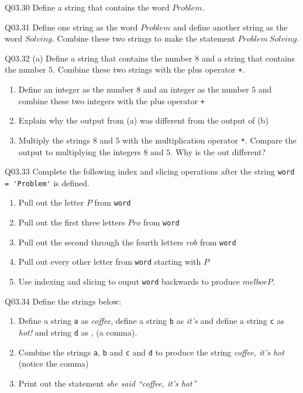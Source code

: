 \documentclass{book}
\newcommand{\passthrough}[1]{#1}
\begin{document}
Q03.30 Define a string that contains the word \(Problem\).

Q03.31 Define one string as the word \(Problem\) and define another
string as the word \(Solving\). Combine these two strings to make the
statement \(Problem \ Solving\).

Q03.32 (a) Define a string that contains the number \(8\) and a string
that contains the number \(5\). Combine these two strings with the plus
operator \passthrough{\lstinline!+!}.

\begin{enumerate}
\def\labelenumi{(\alph{enumi})}
\setcounter{enumi}{1}
\item
  Define an integer as the number \(8\) and an integer as the number
  \(5\) and combine these two integers with the plus operator
  \passthrough{\lstinline!+!}
\item
  Explain why the output from (a) was different from the output of (b)
\item
  Multiply the strings \(8\) and \(5\) with the multiplication operator
  \passthrough{\lstinline!*!}. Compare the output to multiplying the
  integers \(8\) and \(5\). Why is the out different?
\end{enumerate}

Q03.33 Complete the following index and slicing operations after the
string \passthrough{\lstinline!word = 'Problem'!} is defined.

\begin{enumerate}
\def\labelenumi{(\alph{enumi})}
\item
  Pull out the letter \(P\) from \passthrough{\lstinline!word!}
\item
  Pull out the first three letters \(Pro\) from
  \passthrough{\lstinline!word!}
\item
  Pull out the second through the fourth letters \(rob\) from
  \passthrough{\lstinline!word!}
\item
  Pull out every other letter from \passthrough{\lstinline!word!}
  starting with \(P\)
\item
  Use indexing and slicing to ouput \passthrough{\lstinline!word!}
  backwards to produce \(melborP\).
\end{enumerate}

Q03.34 Define the strings below:

\begin{enumerate}
\def\labelenumi{(\alph{enumi})}
\item
  Define a string \passthrough{\lstinline!a!} as \emph{coffee}, define a
  string \passthrough{\lstinline!b!} as \emph{it's} and define a string
  \passthrough{\lstinline!c!} as \emph{hot!} and string
  \passthrough{\lstinline!d!} as , (a comma).
\item
  Combine the strings \passthrough{\lstinline!a!},
  \passthrough{\lstinline!b!} and \passthrough{\lstinline!c!} and
  \passthrough{\lstinline!d!} to produce the string \emph{coffee, it's
  hot} (notice the comma)
\item
  Print out the statement \emph{she said ``coffee, it's hot''}
\end{enumerate}
\end{document}
